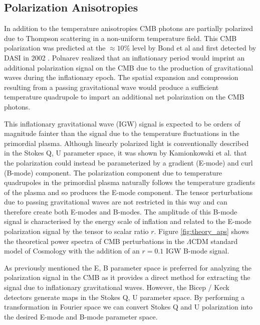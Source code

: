 \documentclass[12pt]{article}
\begin{document}
\subsection{Polarization Anisotropies}
In addition to the temperature anisotropies CMB photons are partially
polarized due to Thompson scattering in a non-uniform temperature field. This
CMB polarization was predicted at the $\approx 10\%$ level by Bond et al
\cite{cite:Bond} and first detected by DASI in 2002 \cite{cite:DASI}. Polnarev
\cite{cite:Polnarev} realized that an inflationary period would imprint an
additional polarization signal on the CMB due to the production of
gravitational waves during the inflationary epoch. The spatial expansion and
compression resulting from a passing gravitational wave would produce a
sufficient temperature quadrupole to impart an additional net polarization on the CMB
photons.



This inflationary gravitational wave (IGW) signal is expected to be orders of
magnitude fainter than the signal due to the temperature fluctuations in the
primordial plasma. Although linearly polarized light is conventionally
described in the Stokes Q, U parameter space, it was shown by Kamionkowski et
al.  \cite{cite:Kamionkowski} that the polarization could instead be
parameterized by a gradient (E-mode) and curl (B-mode) component. The
polarization component due to temperature quadrupoles in the primordial plasma
naturally follows the temperature gradients of the plasma and so produces the
E-mode component. The tensor perturbations due to passing gravitational waves
are not restricted in this way and can therefore create both E-modes and
B-modes. The amplitude of this B-mode signal is characterised by the energy
scale of inflation and related to the E-mode polarization signal by the tensor
to scalar ratio $r$.  Figure \ref{fig:theory_aps} shows the theoretical power
spectra of CMB perturbations in the $\Lambda$CDM standard model of Cosmology
with the addition of an $r=0.1$ IGW B-mode signal. 

As previously mentioned the E, B parameter space is preferred for analyzing
the polarization signal in the CMB as it provides a direct method for
extracting the signal due to inflationary gravitational waves. However, the Bicep /
Keck detectors generate maps in the Stokes Q, U parameter space. By performing
a transformation in Fourier space we can convert Stokes Q and U polarization
into the desired E-mode and B-mode parameter space.
\end{document}
